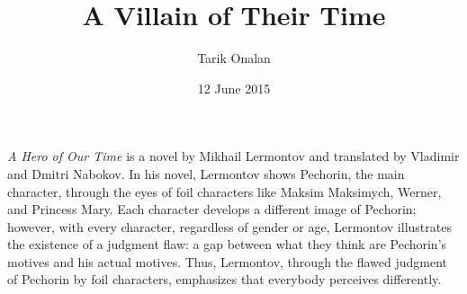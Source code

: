 \documentclass[a4paper,12pt]{article}
\title{A Villain of Their Time}
\date{12 June 2015}
\author{Tarik Onalan}
\begin{document}
    


    \maketitle


    \textit{A Hero of Our Time} is a novel by Mikhail Lermontov and translated by Vladimir and
    Dmitri Nabokov. In his novel, Lermontov shows Pechorin, the main character, through the eyes
    of foil characters like Maksim Maksimych, Werner, and Princess Mary. Each character develops
    a different image of Pechorin; however, with every character, regardless of gender or age,
    Lermontov illustrates the existence of a judgment flaw: a gap between what they think are
    Pechorin's motives and his actual motives. Thus,
    Lermontov, through the flawed judgment of Pechorin by foil characters, emphasizes that
    everybody perceives differently.

\end{document}
